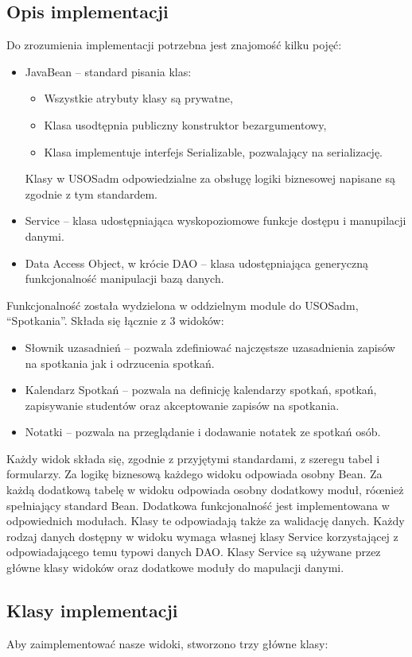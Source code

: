 \documentclass[licencjacka]{pracamgr}
\begin{document}
\subsection{Opis implementacji}
Do zrozumienia implementacji potrzebna jest znajomość kilku pojęć:
\begin{itemize}
\item JavaBean -- standard pisania klas:
\begin{itemize}
\item Wszystkie atrybuty klasy są prywatne,
\item Klasa usodtępnia publiczny konstruktor bezargumentowy,
\item Klasa implementuje interfejs Serializable, pozwalający na serializację.
\end{itemize}
Klasy w USOSadm odpowiedzialne za obsługę logiki biznesowej napisane są zgodnie z tym standardem.
\item Service -- klasa udostępniająca wyskopoziomowe funkcje dostępu i manupilacji danymi.
\item Data Access Object, w krócie DAO -- klasa udostępniająca generyczną funkcjonalność manipulacji bazą danych.
\end{itemize}
Funkcjonalność została wydzielona w oddzielnym module do USOSadm, \enquote{Spotkania}. Składa się łącznie z 3 widoków:
\begin{itemize}
\item Słownik uzasadnień -- pozwala zdefiniować najczęstsze uzasadnienia zapisów na spotkania jak i odrzucenia spotkań.
\item Kalendarz Spotkań -- pozwala na definicję kalendarzy spotkań, spotkań, zapisywanie studentów oraz akceptowanie zapisów na spotkania.
\item Notatki -- pozwala na przeglądanie i dodawanie notatek ze spotkań osób.
\end{itemize}
Każdy widok składa się, zgodnie z przyjętymi standardami, z szeregu tabel i formularzy. Za logikę biznesową każdego widoku odpowiada osobny Bean. Za każdą dodatkową tabelę w widoku odpowiada osobny dodatkowy moduł, róœnież spełniający standard Bean. Dodatkowa funkcjonalność jest implementowana w odpowiednich modułach. Klasy te odpowiadają także za walidację danych.
Każdy rodzaj danych dostępny w widoku wymaga własnej klasy Service korzystającej z odpowiadającego temu typowi danych DAO. Klasy Service są używane przez główne klasy widoków oraz dodatkowe moduły do mapulacji danymi.

\subsection{Klasy implementacji}
Aby zaimplementować nasze widoki, stworzono trzy główne klasy:
\end{document}
